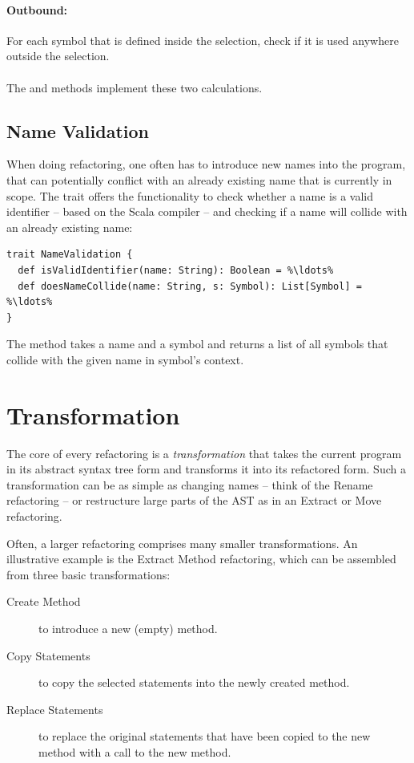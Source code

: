 \paragraph{Outbound:} For each symbol that is defined inside the selection, check if it is used anywhere outside the selection.
\\\\
The  and  methods implement these two calculations. 

\subsection{Name Validation}

When doing refactoring, one often has to introduce new names into the program, that can potentially conflict with an already existing name that is currently in scope. The  trait offers the functionality to check whether a name is a valid identifier -- based on the Scala compiler -- and checking if a name will collide with an already existing name:

\begin{lstlisting}
trait NameValidation {
  def isValidIdentifier(name: String): Boolean = %\ldots%
  def doesNameCollide(name: String, s: Symbol): List[Symbol] = %\ldots%
}
\end{lstlisting}

The  method takes a name and a symbol and returns a list of all symbols that collide with the given name in symbol's context.

\section{Transformation} \label{section:transformation}

The core of every refactoring is a \textit{transformation} that takes the current program in its abstract syntax tree form and transforms it into its refactored form. Such a transformation can be as simple as changing names -- think of the Rename refactoring -- or restructure large parts of the AST as in an Extract or Move refactoring. 

Often, a larger refactoring comprises many smaller transformations. An illustrative example is the Extract Method refactoring, which can be assembled from three basic transformations:

\begin{description}
 \item[Create Method] to introduce a new (empty) method.
 \item[Copy Statements] to copy the selected statements into the newly created method.
 \item[Replace Statements] to replace the original statements that have been copied to the new method with a call to the new method.
\end{description}

